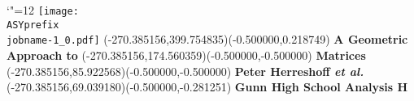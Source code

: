 \setlength{\unitlength}{1pt}
\makeatletter%
\let\ASYencoding\f@encoding%
\let\ASYfamily\f@family%
\let\ASYseries\f@series%
\let\ASYshape\f@shape%
\makeatother%
{\catcode`"=12%
\texttt{[image: \\ASYprefix\\jobname-1\_0.pdf]}%
}%
\color{ASYcolor}
\fontsize{12.000000}{14.400000}\selectfont
\usefont{\ASYencoding}{\ASYfamily}{\ASYseries}{\ASYshape}%
\ASYalign(-270.385156,399.754835)(-0.500000,0.218749){{\bfseries \fontsize{36}{48} \selectfont A Geometric Approach to}}%
\color{ASYcolor}
\fontsize{12.000000}{14.400000}\selectfont
\ASYalign(-270.385156,174.560359)(-0.500000,-0.500000){{\bfseries \fontsize{84}{112} \selectfont Matrices}}%
\color{ASYcolor}
\fontsize{12.000000}{14.400000}\selectfont
\ASYalign(-270.385156,85.922568)(-0.500000,-0.500000){{\bfseries \fontsize{18}{24} \selectfont Peter Herreshoff \textit{et al.}}}%
\color{ASYcolor}
\fontsize{12.000000}{14.400000}\selectfont
\ASYalign(-270.385156,69.039180)(-0.500000,-0.281251){{\bfseries \fontsize{12}{16} \selectfont Gunn High School Analysis H}}%
